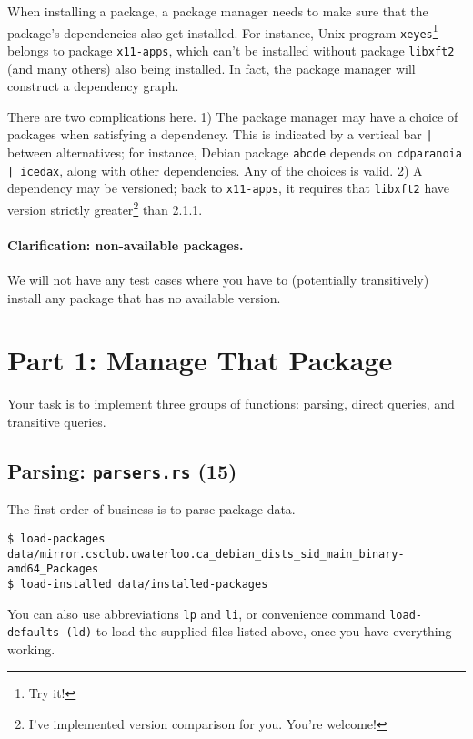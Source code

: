 \documentclass[12pt]{article}
\renewcommand{\_}{\kern-1.5pt\textunderscore\kern-1.5pt}
\begin{document}
\vspace{1em}
When installing a package, a package manager needs to make sure that the package's dependencies also get installed. For instance, Unix program \texttt{xeyes}\footnote{Try it!} belongs to package \texttt{x11-apps}, which can't be installed without package \texttt{libxft2} (and many others) also being installed. In fact, the package manager will construct a dependency graph. \par

\vspace{1em}
There are two complications here. 1) The package manager may have a choice of packages when satisfying a dependency. This is indicated by a vertical bar \texttt{|} between alternatives; for instance, Debian package \texttt{abcde} depends on \texttt{cdparanoia | icedax}, along with other dependencies. Any of the choices is valid. 2) A dependency may be versioned; back to \texttt{x11-apps}, it requires that \texttt{libxft2} have version strictly greater\footnote{I've implemented version comparison for you. You're welcome!} than 2.1.1.\par

\paragraph*{Clarification: non-available packages.} We will not have any test cases where you have to (potentially transitively) install any package that has no available version.

\section*{Part 1: Manage That Package}

Your task is to implement three groups of functions: parsing, direct queries, and transitive queries.

\subsection*{Parsing: \texttt{parsers.rs} (15)}

The first order of business is to parse package data. 

{\small
\begin{verbatim}
$ load-packages data/mirror.csclub.uwaterloo.ca_debian_dists_sid_main_binary-amd64_Packages
$ load-installed data/installed-packages
\end{verbatim}
}

\vspace{1em}
You can also use abbreviations \texttt{lp} and \texttt{li}, or convenience command \texttt{load-defaults (ld)} 
to load the supplied files listed above, once you have everything working.\par
\end{document}
